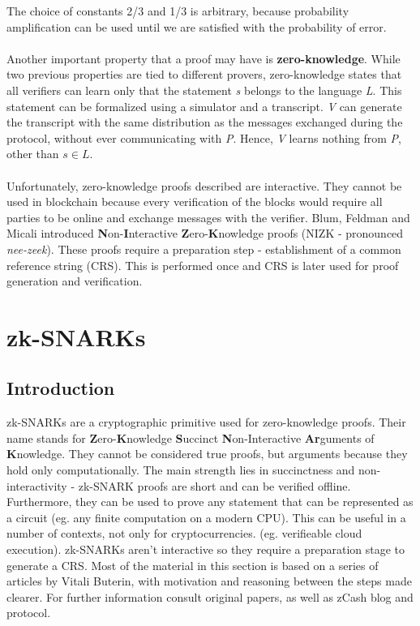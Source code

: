 The choice of constants 2/3 and 1/3 is arbitrary, because probability amplification can be used until we are satisfied with the probability of error.\\
\\
Another important property that a proof may have is \textbf{zero-knowledge}. While two previous properties are tied to different provers, zero-knowledge states that all verifiers can learn only that the statement \textit{s} belongs to the language \textit{L}. This statement can be formalized using a simulator and a transcript. \textit{V} can generate the transcript with the same distribution as the messages exchanged during the protocol, without ever communicating with \textit{P}. Hence, \textit{V} learns nothing from \textit{P}, other than $s \in L$.\\
\\
Unfortunately, zero-knowledge proofs described are interactive. They cannot be used in blockchain because every verification of the blocks would require all parties to be online and exchange messages with the verifier. Blum, Feldman and Micali introduced \textbf{N}on-\textbf{I}nteractive \textbf{Z}ero-\textbf{K}nowledge proofs (NIZK - pronounced \textit{nee-zeek}). These proofs require a preparation step - establishment of a common reference string (CRS). This is performed once and CRS is later used for proof generation and verification.

\section{zk-SNARKs}

\subsection{Introduction}
zk-SNARKs are a cryptographic primitive used for zero-knowledge proofs. Their name stands for \textbf{Z}ero-\textbf{K}nowledge \textbf{S}uccinct \textbf{N}on-Interactive \textbf{Ar}guments of \textbf{K}nowledge. They cannot be considered true proofs, but arguments because they hold only computationally. The main strength lies in succinctness and non-interactivity - zk-SNARK proofs are short and can be verified offline. Furthermore, they can be used to prove any statement that can be represented as a circuit (eg. any finite computation on a modern CPU). This can be useful in a number of contexts, not only for cryptocurrencies. (eg. verifieable cloud execution). zk-SNARKs aren't interactive so they require a preparation stage to generate a CRS. Most of the material in this section is based on a series of articles by Vitali Buterin, with motivation and reasoning between the steps made clearer. For further information consult original papers, as well as zCash blog and protocol. %

